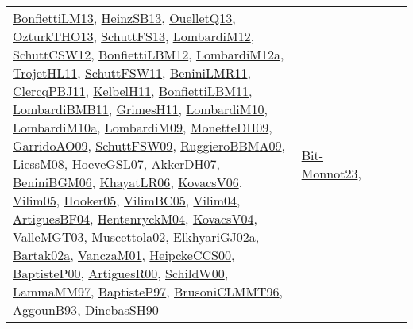 {\begin{longtable}{lp{3cm}>{\raggedright}p{6cm}>{\raggedright}p{6cm}p{8cm}}
\href{papers/BonfiettiLM13.pdf}{BonfiettiLM13}\cite{BonfiettiLM13}, \href{articles/HeinzSB13.pdf}{HeinzSB13}\cite{HeinzSB13}, \href{papers/OuelletQ13.pdf}{OuelletQ13}\cite{OuelletQ13}, \href{articles/OzturkTHO13.pdf}{OzturkTHO13}\cite{OzturkTHO13}, \href{papers/SchuttFS13.pdf}{SchuttFS13}\cite{SchuttFS13}, \href{articles/LombardiM12.pdf}{LombardiM12}\cite{LombardiM12}, \href{papers/SchuttCSW12.pdf}{SchuttCSW12}\cite{SchuttCSW12}, \href{papers/BonfiettiLBM12.pdf}{BonfiettiLBM12}\cite{BonfiettiLBM12}, \href{articles/LombardiM12a.pdf}{LombardiM12a}\cite{LombardiM12a}, \href{articles/TrojetHL11.pdf}{TrojetHL11}\cite{TrojetHL11}, \href{articles/SchuttFSW11.pdf}{SchuttFSW11}\cite{SchuttFSW11}, \href{articles/BeniniLMR11.pdf}{BeniniLMR11}\cite{BeniniLMR11}, \href{papers/ClercqPBJ11.pdf}{ClercqPBJ11}\cite{ClercqPBJ11}, \href{articles/KelbelH11.pdf}{KelbelH11}\cite{KelbelH11}, \href{papers/BonfiettiLBM11.pdf}{BonfiettiLBM11}\cite{BonfiettiLBM11}, \href{papers/LombardiBMB11.pdf}{LombardiBMB11}\cite{LombardiBMB11}, \href{papers/GrimesH11.pdf}{GrimesH11}\cite{GrimesH11}, \href{papers/LombardiM10.pdf}{LombardiM10}\cite{LombardiM10}, \href{articles/LombardiM10a.pdf}{LombardiM10a}\cite{LombardiM10a}, \href{papers/LombardiM09.pdf}{LombardiM09}\cite{LombardiM09}, \href{papers/MonetteDH09.pdf}{MonetteDH09}\cite{MonetteDH09}, \href{articles/GarridoAO09.pdf}{GarridoAO09}\cite{GarridoAO09}, \href{papers/SchuttFSW09.pdf}{SchuttFSW09}\cite{SchuttFSW09}, \href{articles/RuggieroBBMA09.pdf}{RuggieroBBMA09}\cite{RuggieroBBMA09}, \href{articles/LiessM08.pdf}{LiessM08}\cite{LiessM08}, \href{papers/HoeveGSL07.pdf}{HoeveGSL07}\cite{HoeveGSL07}, \href{papers/AkkerDH07.pdf}{AkkerDH07}\cite{AkkerDH07}, \href{papers/BeniniBGM06.pdf}{BeniniBGM06}\cite{BeniniBGM06}, \href{articles/KhayatLR06.pdf}{KhayatLR06}\cite{KhayatLR06}, \href{papers/KovacsV06.pdf}{KovacsV06}\cite{KovacsV06}, \href{papers/Vilim05.pdf}{Vilim05}\cite{Vilim05}, \href{articles/Hooker05.pdf}{Hooker05}\cite{Hooker05}, \href{articles/VilimBC05.pdf}{VilimBC05}\cite{VilimBC05}, \href{papers/Vilim04.pdf}{Vilim04}\cite{Vilim04}, \href{papers/ArtiguesBF04.pdf}{ArtiguesBF04}\cite{ArtiguesBF04}, \href{papers/HentenryckM04.pdf}{HentenryckM04}\cite{HentenryckM04}, \href{papers/KovacsV04.pdf}{KovacsV04}\cite{KovacsV04}, \href{papers/ValleMGT03.pdf}{ValleMGT03}\cite{ValleMGT03}, \href{papers/Muscettola02.pdf}{Muscettola02}\cite{Muscettola02}, \href{papers/ElkhyariGJ02a.pdf}{ElkhyariGJ02a}\cite{ElkhyariGJ02a}, \href{papers/Bartak02a.pdf}{Bartak02a}\cite{Bartak02a}, \href{papers/VanczaM01.pdf}{VanczaM01}\cite{VanczaM01}, \href{articles/HeipckeCCS00.pdf}{HeipckeCCS00}\cite{HeipckeCCS00}, \href{articles/BaptisteP00.pdf}{BaptisteP00}\cite{BaptisteP00}, \href{articles/ArtiguesR00.pdf}{ArtiguesR00}\cite{ArtiguesR00}, \href{articles/SchildW00.pdf}{SchildW00}\cite{SchildW00}, \href{articles/LammaMM97.pdf}{LammaMM97}\cite{LammaMM97}, \href{papers/BaptisteP97.pdf}{BaptisteP97}\cite{BaptisteP97}, \href{papers/BrusoniCLMMT96.pdf}{BrusoniCLMMT96}\cite{BrusoniCLMMT96}, \href{articles/AggounB93.pdf}{AggounB93}\cite{AggounB93}, \href{articles/DincbasSH90.pdf}{DincbasSH90}\cite{DincbasSH90} & \href{papers/Bit-Monnot23.pdf}{Bit-Monnot23}\cite{Bit-Monnot23}, 
\end{longtable}}

